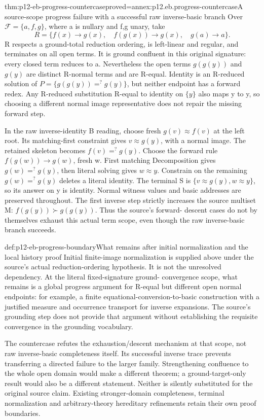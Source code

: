 \begin{hbtheorem}{thm:p12-eb-progress-countercase}{proved=annex:p12.eb.progress-countercase}{A source-scope progress failure with a successful raw inverse-basic branch}
Over \(\mathcal F=\{a,f,g\}\), where a is nullary and f,g
unary, take
\[
 R=\{f(x)\to g(x),\quad f(g(x))\to g(x),\quad g(a)\to a\}.
\]
R respects a ground-total reduction ordering, is left-linear and regular, and
terminates on all open terms. It is ground confluent in this
original signature: every closed term reduces to a. Nevertheless
the open terms \(g(g(y))\) and \(g(y)\) are distinct R-normal
terms and are R-equal. Identity is an R-reduced solution of
\(P=\{g(g(y))=^{?}g(y)\}\), but neither endpoint has a
forward redex. Any R-reduced substitution R-equal to identity
on \(\{y\}\) also maps y to y, so choosing a different normal
image representative does not repair the missing forward step.

In the raw inverse-identity B reading, choose fresh
\(g(v)\approx f(v)\) at the left root. Its matching-first
constraint gives \(v\approx g(y)\), with a normal image.
The retained skeleton becomes \(f(v)=^{?}g(y)\).
Choose the forward rule \(f(g(w))\to g(w)\), fresh w.
First matching Decomposition gives \(g(w)=^{?}g(y)\), then
literal solving gives \(w\approx y\). Constrain on the remaining
\(g(w)=^{?}g(y)\) deletes a literal identity. The terminal
S is \(\{v\approx g(y),w\approx y\}\), so its answer on y
is identity. Normal witness values and basic addresses are preserved
throughout. The first inverse step strictly increases the source
multiset M: \(f(g(y))\succ g(g(y))\). Thus the source's forward-
descent cases do not by themselves exhaust this actual term scope,
even though the raw inverse-basic branch succeeds.
\end{hbtheorem}

\begin{proofboundary}{def:p12-eb-progress-boundary}{What remains after initial normalization and the local history proof}
Initial finite-image normalization is supplied above under the
source's actual reduction-ordering hypothesis. It is not the
unresolved dependency. At the literal fixed-signature ground-
convergence scope, what remains is a global progress argument for
R-equal but different open normal endpoints: for example, a finite
equational-conversion-to-basic construction with a justified measure
and occurrence transport for inverse expansions. The source's
grounding step does not provide that argument without establishing
the requisite convergence in the grounding vocabulary.

The countercase refutes the exhaustion/descent mechanism at that
scope, not raw inverse-basic completeness itself. Its successful
inverse trace prevents transferring a directed failure to the
larger family. Strengthening confluence to the whole open domain
would make a different theorem; a ground-target-only result would
also be a different statement. Neither is silently substituted for
the original source claim. Existing stronger-domain completeness,
terminal normalization and arbitrary-theory hereditary refinements
retain their own proof boundaries.
\cite[Theorem4.13 proof, pp.~497--498]{BaaderSnyder2001}
\end{proofboundary}
